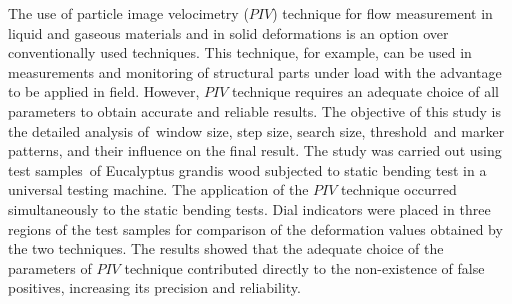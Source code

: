 The use of particle image velocimetry ($PIV$) technique for flow measurement
in liquid and gaseous materials and in solid deformations 
is an option over conventionally used techniques. This technique, for example, 
can be used in measurements and monitoring of structural parts under load 
with the advantage to be applied in field. However,
$PIV$ technique requires an adequate choice of all parameters to obtain accurate and reliable results. 
The objective of this study is 
the detailed analysis of window size, step size, search size, threshold and 
marker patterns, and their influence  on 
the final result. The study was carried out using test samples of Eucalyptus 
grandis wood subjected to static bending test in a universal testing machine. 
The application of the $PIV$ technique occurred simultaneously to the static 
bending tests. Dial indicators were placed in three regions of the test samples 
for comparison of the deformation values ​​obtained by the two techniques. The 
results showed that the adequate choice of the parameters of  $PIV$ technique 
contributed directly to the non-existence of false positives, increasing its 
precision and reliability.
